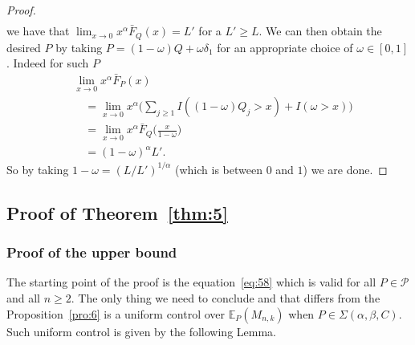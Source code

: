 \documentclass{article}
\newcommand{\1}{\boldsymbol{1}}
\newcommand{\EE}{\mathbb{E}}
\theoremstyle{plain}
\begin{document}
\begin{proof}
\begin{align*}
  \end{align*}
  we have that $\lim_{x\to 0}x^{\alpha}\bar{F}_Q(x) = L'$ for a $L' \geq L$. We can then obtain the desired $P$ by taking $P = (1 - \omega)Q + \omega \delta_1$ for an appropriate choice of $\omega \in [0,1]$. Indeed for such $P$
  \begin{align*}
    &\lim_{x \to 0}x^{\alpha}\bar{F}_P(x)\\
    &\quad= \lim_{x \to 0}x^{\alpha}\Bigg( \sum_{j\geq 1}I((1-\omega)Q_j > x) + I(\omega > x) \Bigg)\\
    &\quad= \lim_{x\to 0}x^{\alpha} \bar{F}_Q\Big(\frac{x}{1-\omega}\Big)\\
    &\quad= (1-\omega)^{\alpha}L'.
  \end{align*}
  So by taking $1 - \omega = (L/L')^{1/\alpha}$ (which is between $0$ and $1$) we are done.
\end{proof}

\subsection{Proof of Theorem~\ref{thm:5}}
\label{sec:proof-thm:5}


\subsubsection{Proof of the upper bound}
\label{sec:proof-upper-bound-1}



The starting point of the proof is the equation~\eqref{eq:58} which is valid for all $P \in \mathcal{P}$ and all $n \geq 2$. The only thing we need to conclude and that differs from the Proposition~\ref{pro:6} is a uniform control over $\EE_P(M_{n,k})$ when $P \in \Sigma(\alpha,\beta,C)$. Such uniform control is given by the following Lemma.
\end{document}
